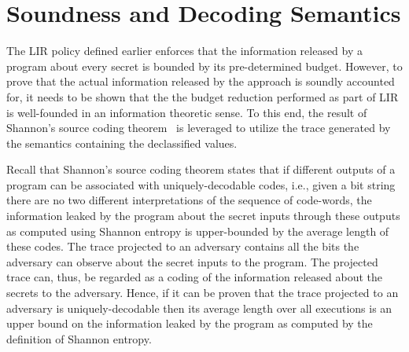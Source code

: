 \section{Soundness and Decoding Semantics}
\label{sec:lir:decoding}

The LIR policy defined earlier enforces that the information released 
by a program about every secret is bounded by its pre-determined budget. 
However, to prove that the actual information released by the approach is 
soundly accounted for, it needs to be shown that the the budget
reduction performed as part of LIR is well-founded in an information
theoretic sense. To this end, the result of Shannon's source coding
theorem~\cite{shannon} is leveraged to utilize the trace generated
by the semantics containing the declassified values. 

Recall that Shannon's source coding theorem states that if 
different outputs of a program can be associated with uniquely-decodable
codes, i.e., given a bit string there are no two different  
interpretations of the sequence of code-words, the information 
leaked by the program about the secret inputs through these outputs 
as computed using Shannon entropy is upper-bounded by the average 
length of these codes. The trace projected to an adversary contains all  
the bits the adversary can observe about the secret inputs 
to the program. The projected trace can, thus, be regarded as a coding 
of the information released about the secrets to the adversary. 
Hence, if it can be proven that the trace projected to an adversary
is uniquely-decodable then its average length over all executions
is an upper bound on the information leaked by the program as 
computed by the definition of Shannon entropy. 

